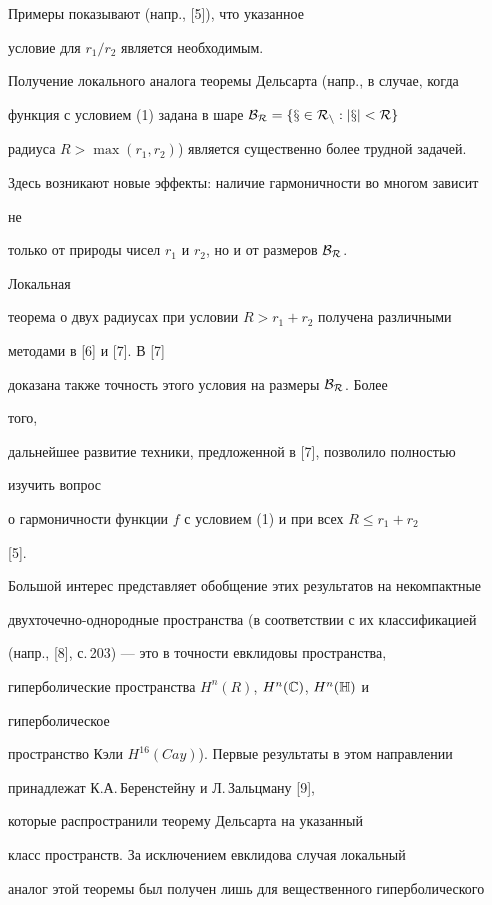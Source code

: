 Примеры показывают (напр., [5]), что указанное 


условие для $r_1/r_2$ является необходимым. 


 


Получение локального аналога теоремы Дельсарта (напр., в случае, когда 


функция с условием (1) задана в шаре $\cal B_R=\{x\in R_n:|x|<R\}$ 


радиуса $R>\max(r_1,r_2)$) является существенно более трудной задачей. 


Здесь возникают новые эффекты: наличие гармоничности во многом зависит 


не 


только от природы чисел $r_1$ и $r_2$, но и от размеров $\cal B_R$. 


Локальная 


теорема о двух радиусах при условии $R>r_1+r_2$ получена различными 


методами в [6] и [7]. В [7] 


доказана также точность этого условия на размеры $\cal B_R$. Более 


того, 


дальнейшее развитие техники, предложенной в [7], позволило полностью 


изучить вопрос 


о гармоничности функции $f$ с условием (1) и при всех $R\le r_1+r_2$


[5]. 


Большой интерес представляет обобщение этих результатов на некомпактные 


двухточечно-однородные пространства (в соответствии с их классификацией 


(напр., [8], с.\,203) --- это в точности евклидовы пространства, 


гиперболические пространства $H^n(R)$, $H^n(\Bbb C)$, $H^n(\Bbb H)$ и 


гиперболическое 


пространство Кэли $H^{16}(Cay)$). Первые результаты в этом направлении 


принадлежат К.А.\,Беренстейну и Л.\,Зальцману [9], 


которые распространили теорему Дельсарта на указанный 


класс пространств. За исключением евклидова случая локальный 


аналог этой теоремы был получен лишь для вещественного гиперболического 


